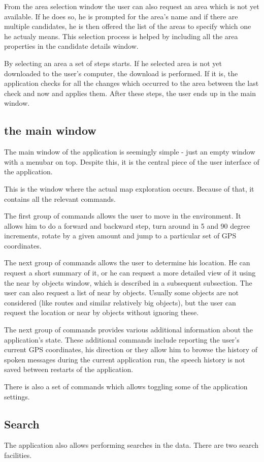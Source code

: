 \documentclass[nolof,digital]{fithesis3}
\begin{document}
From the area selection window the user can also request an area which is not yet available. If he does so, he is prompted for the area's name and if there are multiple candidates, he is then offered the list of the areas to specify which one he actualy means. This selection process is helped by including all the area properties in the candidate details window.

By selecting an area a set of steps starts. If he selected area is not yet downloaded to the user's computer, the download is performed. If it is, the application checks for all the changes which occurred to the area between the last check and now and applies them. After these steps, the user ends up in the main window.
\subsection{the main window}
The main window of the application is seemingly simple - just an empty window with a menubar on top. Despite this, it is the central piece of the user interface of the application.

This is the window where the actual map exploration occurs. Because of that, it contains all the relevant commands.

The first group of commands allows the user to move in the environment. It allows him to do a forward and backward step, turn around in 5 and 90 degree increments, rotate by a given amount and jump to a particular set of GPS coordinates.

The next group of commands allows the user to determine his location. He can request a short summary of it, or he can request a more detailed view of it using the near by objects window, which is described in a subsequent subsection. The user can also request a list of near by objects. Usually some objects are not considered (like routes and similar relatively big objects), but the user can request the location or near by objects without ignoring these.

The next group of commands provides various additional information about the application's state. These additional commands include reporting the user's current GPS coordinates, his direction or they allow him to browse the history of spoken messages during the current application run, the speech history is not saved between restarts of the application.

There is also a set of commands which allows toggling some of the application settings.
\subsection{Search}
The application also allows performing searches in the data. There are two search facilities.
\end{document}

